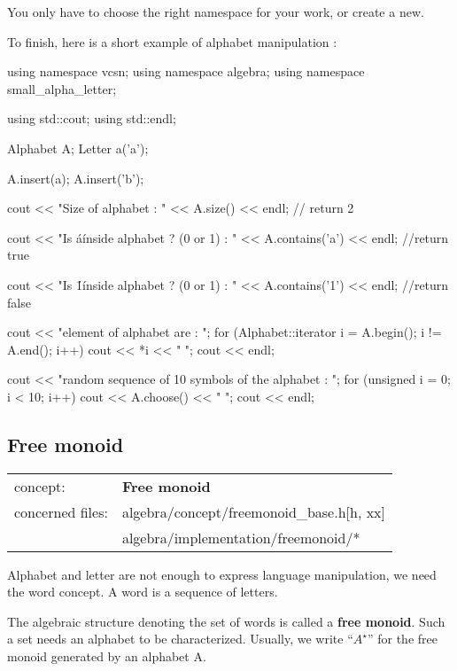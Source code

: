 \documentclass{article}
\begin{document}
You only have to choose the right namespace for your work, or create a new.

To finish, here is a short example of alphabet manipulation :

\begin{code}
  using namespace vcsn;
  using namespace algebra;
  using namespace small_alpha_letter;
  
  using std::cout;
  using std::endl;
  
  Alphabet A;
  Letter a('a');

  A.insert(a);
  A.insert('b');
  
  cout << "Size of alphabet : "
       << A.size() << endl;                // return 2
    
  cout << "Is \'a\' inside alphabet ? (0 or 1) : "
       << A.contains('a') << endl;         //return true

  cout << "Is \'1\' inside alphabet ? (0 or 1) : "
       << A.contains('1') << endl;         //return false
  
  cout << "element of alphabet are : ";
  for (Alphabet::iterator i = A.begin(); i != A.end(); i++)
    cout << *i << " ";
  cout << endl;
  
  cout << "random sequence of 10 symbols of the alphabet : ";
  for (unsigned i = 0; i < 10; i++)
    cout << A.choose() << " ";
  cout << endl;
\end{code}

\subsection{Free monoid}

\begin{tabular}%
{ll}
\hline 
concept: & \textbf{Free monoid}  \\
concerned files: & algebra/concept/freemonoid\_base.h[h, xx] \\
                 & algebra/implementation/freemonoid/* \\
\hline 
\end{tabular}

\hspace{1cm}

Alphabet and letter are not enough to express language manipulation,
we need the word concept. A word is a sequence of letters. 

The algebraic structure denoting the set of words is called a
\textbf{free monoid}. Such a set needs an alphabet to be
characterized. Usually, we write ``$A^{\star}$'' for the free monoid
generated by an alphabet A.
\end{document}
